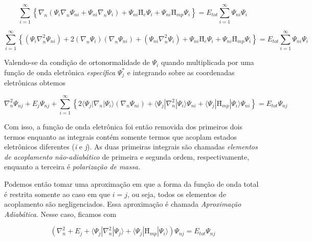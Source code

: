 	\begin{equation}
	\sum_{i=1}^{\infty} \left\{ \nabla_n\left(\Psi_{i}\nabla_n\Psi_{ni} + \Psi_{ni}\nabla_n\Psi_{i} \right) + \Psi_{ni} \textbf{\^H}_e \Psi_{i}  + \Psi_{ni} \textbf{\^H}_{mp} \Psi_{i} \right\} = E_{tot} \sum_{i=1}^{\infty} \Psi_{ni}\Psi_{i}
	\end{equation}
	
	\begin{equation}
	\label{schrodinger_6}
	\sum_{i=1}^{\infty} \left\{ \left(\Psi_{i}\nabla_n^2\Psi_{ni} \right) + 2\left(\nabla_n\Psi_{i} \right)\left(\nabla_n\Psi_{ni} \right) + \left(\Psi_{ni}\nabla_n^2\Psi_{i} \right) + \Psi_{ni} \textbf{\^H}_e \Psi_{i}  + \Psi_{ni} \textbf{\^H}_{mp} \Psi_{i} \right\} = E_{tot} \sum_{i=1}^{\infty} \Psi_{ni}\Psi_{i}
	\end{equation}
	
	Valendo-se da condição de ortonormalidade de $\Psi_{i}$ quando multiplicada por uma função de onda eletrônica \textit{específica} $\Psi_{j}^\ast$ e integrando sobre as coordenadas eletrônicas obtemos
	
	\begin{equation}
	\label{schrodinger_7}
	\nabla_n^2\Psi_{nj} + E_j\Psi_{nj} + \sum_{i=1}^{\infty} \left\{ 2\langle\Psi_j|\nabla_n|\Psi_i\rangle \left(\nabla_n \Psi_{ni} \right) + \langle\Psi_j|\nabla_n^2|\Psi_i\rangle\Psi_{ni} + \langle\Psi_j|\textbf{\^H}_{mp}|\Psi_i\rangle\Psi_{ni} \right\} = E_{tot} \Psi_{nj}
	\end{equation}
	
	Com isso, a função de onda eletrônica foi então removida dos primeiros dois termos enquanto as integrais contém somente termos que acoplam estados eletrônicos diferentes (\textit{i} e \textit{j}). As duas primeiras integrais são chamadas \textit{elementos de acoplamento não-adiabático} de primeira e segunda ordem, respectivamente, enquanto a terceira é \textit{polarização de massa}. 
	
	Podemos então tomar uma aproximação em que a forma da função de onda total é restrita somente ao caso em que $i = j$, ou seja, todos os elementos de acoplamento são negligenciados. Essa aproximação é chamada \textit{Aproximação Adiabática}. Nesse caso, ficamos com
	
	\begin{equation}
	\label{schrodinger_8}
	\left( \nabla_n^2 + E_j + \langle \Psi_j|\nabla_n^2|\Psi_j\rangle + \langle\Psi_j|\textbf{\^H}_{mp}|\Psi_i\rangle \right)\Psi_{nj} = E_{tot}\Psi_{nj}
	\end{equation}
	
